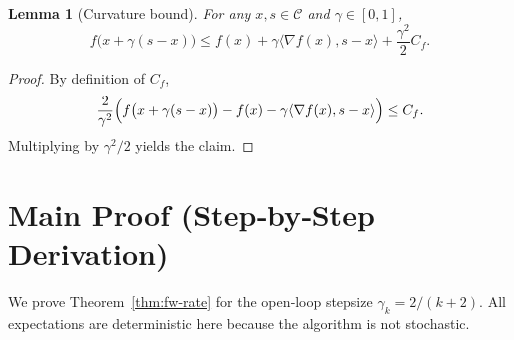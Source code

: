 \documentclass{article}
\newtheorem{lemma}{Lemma}[section]
\begin{document}
\begin{lemma}[Curvature bound]\label{lem:curvature}
For any $x,s\in\mathcal{C}$ and $\gamma\in[0,1]$,
\[
f\bigl(x+\gamma(s-x)\bigr)\le f(x)+\gamma\langle\nabla f(x),s-x\rangle+\frac{\gamma^2}{2}C_f .
\]
\end{lemma}
\begin{proof}
By definition of $C_f$,
\[
\frac{2}{\gamma^2}\Bigl(f\bigl(x+\gamma(s-x)\bigr)-f(x)-\gamma\langle\nabla f(x),s-x\rangle\Bigr)\le C_f .
\]
Multiplying by $\gamma^2/2$ yields the claim. \qedhere
\end{proof}

\section*{Main Proof (Step‑by‑Step Derivation)}
We prove Theorem~\ref{thm:fw-rate} for the open‑loop stepsize $\gamma_k=2/(k+2)$.  
All expectations are deterministic here because the algorithm is not stochastic.
\end{document}
